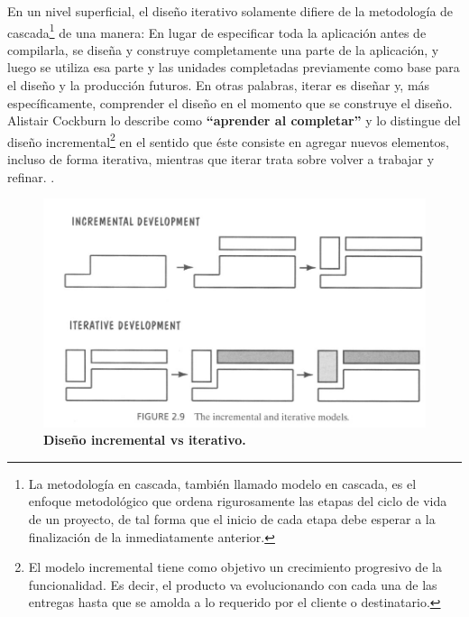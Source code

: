 En un nivel superficial, el diseño iterativo solamente difiere de la metodología de cascada\footnote{La metodología en cascada, también llamado modelo en cascada, es el enfoque metodológico que ordena rigurosamente las etapas del ciclo de vida de un proyecto, de tal forma que el inicio de cada etapa debe esperar a la finalización de la inmediatamente anterior.} de una manera: En lugar de especificar toda la aplicación antes de compilarla, se diseña y construye completamente una parte de la aplicación, y luego se utiliza esa parte y las unidades completadas previamente como base para el diseño y la producción futuros. En otras palabras, iterar es diseñar y, más específicamente, comprender el diseño en el momento que se construye el diseño. Alistair Cockburn lo describe como \textbf{``aprender al completar''} y lo distingue del diseño incremental\footnote{El modelo incremental tiene como objetivo un crecimiento progresivo de la funcionalidad. Es decir, el producto va evolucionando con cada una de las entregas hasta que se amolda a lo requerido por el cliente o destinatario.
} en el sentido que éste consiste en agregar nuevos elementos, incluso de forma iterativa, mientras que iterar trata sobre volver a trabajar y refinar. \citep{Chronicles2009}.

\begin{figure}
\centering
\includegraphics[width=14cm]{Img/CPD/iterativo}
\caption{\textbf{\footnotesize{Diseño incremental vs iterativo.}}}
\label{fig: iterativo}
\end{figure}



